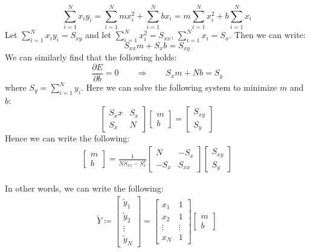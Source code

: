 \documentclass[11pt]{article}
\theoremstyle{break}
\theoremstyle{break}
\begin{document}
$$\sum_{i=1}^Nx_iy_i = \sum_{i=1}^Nm x_i^2 + \sum_{i=1}^N bx_i = m\sum_{i=1}^N x_i^2 + b\sum_{i=1}^Nx_i$$
Let $\sum_{i=1}^Nx_iy_i = S_{xy}$ and let $\sum_{i=1}^N x_i^2 = S_{xx}$, $\sum_{i=1}^Nx_i = S_x$. Then we can write: 
$$S_{xx} m + S_{x} b = S_{xy}$$
We can similarly find that the following holds:
$$\frac{\partial E}{\partial b} = 0 \qquad\Rightarrow\qquad S_xm + Nb = S_y$$
where $S_y =  \sum_{i=1}^N y_i$.
Here we can solve the following system to minimize $m$ and $b$:
$$\begin{bmatrix}
S_xx & S_x \\ S_x & N
\end{bmatrix}\begin{bmatrix}
m \\ b
\end{bmatrix} = 
\begin{bmatrix}
S_{xy} \\ S_y
\end{bmatrix}
$$
Hence we can write the following:
\begin{align*}
\begin{bmatrix}
m \\ b
\end{bmatrix}
= \frac{1}{NS_{xx}-S_x^2}
\begin{bmatrix}
N & -S_x \\ -S_x & S_{xx}  
\end{bmatrix}
\begin{bmatrix}
S_{xy} \\ S_{y}
\end{bmatrix}
\end{align*}

In other words, we can write the following:
\begin{align*}
\widetilde{Y} \coloneqq \begin{bmatrix}
\widetilde{y}_1\\ \widetilde{y}_2 \\\vdots \\ \widetilde{y}_N
\end{bmatrix} = \begin{bmatrix}
x_1 & 1 \\ x_2 & 1 \\ \vdots & \vdots \\ x_N &1 
\end{bmatrix}
\begin{bmatrix}
m \\ b
\end{bmatrix}
\end{align*}
\end{document}
